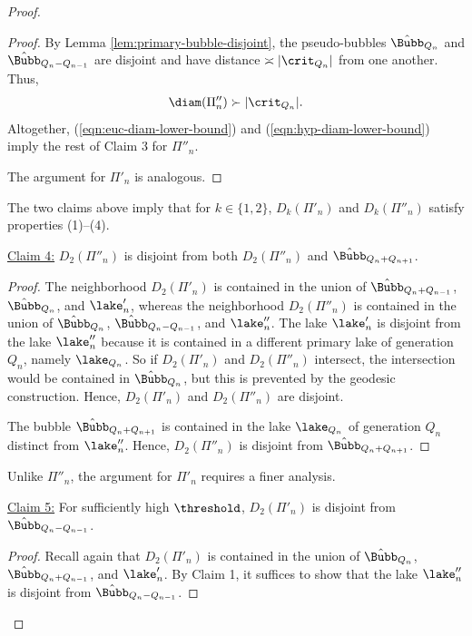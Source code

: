 \documentclass{amsart}
\begin{document}
\begin{proof}
\begin{proof}
        By Lemma \ref{lem:primary-bubble-disjoint}, the pseudo-bubbles $\hat{\Bubb}_{Q_n}$ and $\hat{\Bubb}_{Q_n-Q_{n-1}}$ are disjoint and have distance $\asymp |\crit_{Q_n}|$ from one another.
        Thus,
        \begin{align}
        \label{eqn:euc-diam-lower-bound}
            \diam( \Pi''_n ) \succ |\crit_{Q_n}|.
        \end{align}
        Altogether, (\ref{eqn:euc-diam-lower-bound}) and (\ref{eqn:hyp-diam-lower-bound}) imply the rest of Claim 3 for $\Pi''_n$.

        The argument for $\Pi'_n$ is analogous.
    \end{proof}

    The two claims above imply that for $k \in \{1,2\}$, $D_k(\Pi'_n)$ and $D_k(\Pi''_n)$ satisfy properties (1)--(4).
    \vspace{0.1in}

    \noindent \underline{Claim 4:} $D_2(\Pi''_n)$ is disjoint from both $D_2(\Pi''_n)$ and $\hat{\Bubb}_{Q_n+Q_{n+1}}$.

    \begin{proof}
        The neighborhood $D_2(\Pi'_n)$ is contained in the union of $\hat{\Bubb}_{Q_n+Q_{n-1}}$, $\hat{\Bubb}_{Q_n}$, and $\lake'_n$, whereas the neighborhood $D_2(\Pi''_n)$ is contained in the union of $\hat{\Bubb}_{Q_n}$, $\hat{\Bubb}_{Q_n-Q_{n-1}}$, and $\lake''_n$. 
        The lake $\lake'_n$ is disjoint from the lake $\lake''_n$ because it is contained in a different primary lake of generation $Q_n$, namely $\lake_{Q_n}$.
        So if $D_2(\Pi'_n)$ and $D_2(\Pi''_n)$ intersect, the intersection would be contained in $\hat{\Bubb}_{Q_n}$, but this is prevented by the geodesic construction.
        Hence, $D_2(\Pi'_n)$ and $D_2(\Pi''_n)$ are disjoint.

        The bubble $\hat{\Bubb}_{Q_n+Q_{n+1}}$ is contained in the lake $\lake_{Q_n}$ of generation $Q_n$ distinct from $\lake''_n$.
        Hence, $D_2(\Pi''_n)$ is disjoint from $\hat{\Bubb}_{Q_n+Q_{n+1}}$.
    \end{proof}

    Unlike $\Pi''_n$, the argument for $\Pi'_n$ requires a finer analysis.
    \vspace{0.1in}

    \noindent \underline{Claim 5:} For sufficiently high $\threshold$, $D_2(\Pi'_n)$ is disjoint from $\hat{\Bubb}_{Q_n-Q_{n-1}}$.
    
    \begin{proof}
        Recall again that $D_2(\Pi'_n)$ is contained in the union of $\hat{\Bubb}_{Q_n}$, $\hat{\Bubb}_{Q_n+Q_{n-1}}$, and $\lake'_n$.
        By Claim 1, it suffices to show that the lake $\lake''_n$ is disjoint from $\hat{\Bubb}_{Q_n-Q_{n-1}}$.
        

\end{proof}
\end{proof}
\end{document}
